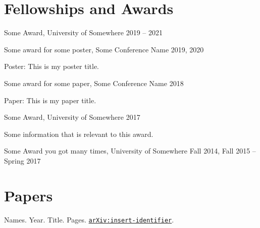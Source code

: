 \documentclass[margin,line]{res}
\newenvironment{basiclist}{
  \begin{list}{}{
      \setlength{\itemsep}{0.06in}
      \setlength{\parsep}{0in} 
      \setlength{\parskip}{0in}
      \setlength{\topsep}{0in} 
      \setlength{\partopsep}{0in} 
      \setlength{\rightmargin}{0in}
      \setlength{\leftmargin}{0in}
      }}{\end{list}
  }
\newenvironment{list-papers}{
  \begin{list}{}{
      \setlength{\itemsep}{0.15in}
      \setlength{\parsep}{0in} 
      \setlength{\parskip}{0in}
      \setlength{\topsep}{0in} 
      \setlength{\partopsep}{0in} 
      \setlength{\leftmargin}{0in}
       }}{\end{list}}
\newenvironment{bullet-italic-right-stop}{
  \begin{list}{$\bullet$}{
      \setlength{\itemsep}{0.02in}
      \setlength{\parsep}{0in} 
      \setlength{\parskip}{0in}
      \setlength{\topsep}{0in} 
      \setlength{\partopsep}{0.025in} 
      \setlength{\rightmargin}{0.89in}
      \setlength{\leftmargin}{0.3in}
      \itshape
      }}{\end{list}
      \vspace*{-0.05in}
  }
\begin{document}
\begin{resume}
\begin{basiclist}
\end{basiclist}


\section{\sc Fellowships  \newline and Awards}

\begin{basiclist}

\item Some Award, University of Somewhere \hfill {2019 -- 2021} 

\item Some award for some poster, Some Conference Name \hfill {2019, 2020} 

\begin{bullet-italic-right-stop}
\item Poster: This is my poster title.
\end{bullet-italic-right-stop}

\item Some award for some paper, Some Conference Name \hfill {2018}

\begin{bullet-italic-right-stop}
\item Paper: This is my paper title.
\end{bullet-italic-right-stop}

\item Some Award, University of Somewhere \hfill {2017}

\begin{bullet-italic-right-stop}
\item Some information that is relevant to this award.
\end{bullet-italic-right-stop}

\item Some Award you got many times, University of Somewhere \hfill {Fall 2014, Fall 2015 -- Spring 2017} 

\end{basiclist}


\section{\sc Papers}

\begin{list-papers}
\item Names. Year. Title. Pages. \href{https://arxiv.org/pdf/this-is-where-my-link-is}{\texttt{arXiv:insert-identifier}}.
\end{list-papers}



\end{resume}
\end{document}
